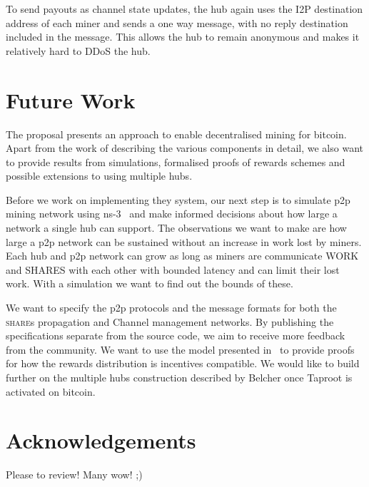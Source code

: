 \documentclass{article}
\begin{document}
To send payouts as channel state updates, the hub again uses the I2P
destination address of each miner and sends a one way message, with no
reply destination included in the message. This allows the hub to
remain anonymous and makes it relatively hard to DDoS the hub.

\section{Future Work}

The proposal presents an approach to enable decentralised mining for
bitcoin. Apart from the work of describing the various components in
detail, we also want to provide results from simulations, formalised
proofs of rewards schemes and possible extensions to using multiple
hubs.

Before we work on implementing they system, our next step is to
simulate p2p mining network using ns-3~\cite{ns3} and make informed
decisions about how large a network a single hub can support. The
observations we want to make are how large a p2p network can be
sustained without an increase in work lost by miners. Each hub and p2p
network can grow as long as miners are communicate WORK and SHARES
with each other with bounded latency and can limit their lost
work. With a simulation we want to find out the bounds of these.

We want to specify the p2p protocols and the message formats for both
the \textsc{share}s propagation and Channel management networks. By
publishing the specifications separate from the source code, we aim to
receive more feedback from the community. We want to use the model
presented in~\cite{incentives-compatible} to provide proofs for how
the rewards distribution is incentives compatible. We would like to
build further on the multiple hubs construction described by Belcher
once Taproot is activated on bitcoin.

\section{Acknowledgements}

Please to review! Many wow! ;)

 

\end{document}
